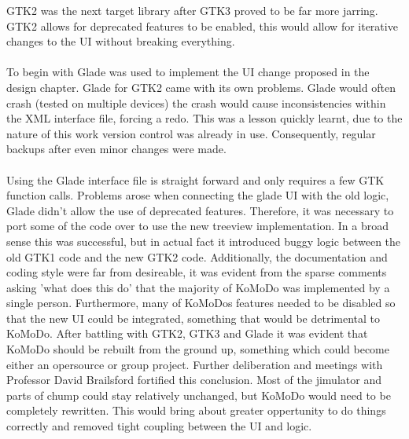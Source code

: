     GTK2 was the next target library after GTK3 proved to be far more jarring. GTK2 allows for deprecated features to be enabled, this would allow for iterative changes to the UI without breaking everything.\\\\
    To begin with Glade was used to implement the UI change proposed in the design chapter. Glade for GTK2 came with its own problems. Glade would often crash (tested on multiple devices) the crash would cause inconsistencies within the XML interface file, forcing a redo. This was a lesson quickly learnt, due to the nature of this work version control was already in use. Consequently, regular backups after even minor changes were made.\\\\
    Using the Glade interface file is straight forward and only requires a few GTK function calls. Problems arose when connecting the glade UI with the old logic, Glade didn't allow the use of deprecated features. Therefore, it was necessary to port some of the code over to use the new treeview implementation. In a broad sense this was successful, but in actual fact it introduced buggy logic between the old GTK1 code and the new GTK2 code. Additionally, the documentation and coding style were far from desireable, it was evident from the sparse comments asking 'what does this do' that the majority of KoMoDo was implemented by a single person. Furthermore, many of KoMoDos features needed to be disabled so that the new UI could be integrated, something that would be detrimental to KoMoDo.
    After battling with GTK2, GTK3 and Glade it was evident that KoMoDo should be rebuilt from the ground up, something which could become either an opersource or group project. Further deliberation and meetings with Professor David Brailsford fortified this conclusion. Most of the jimulator and parts of chump could stay relatively unchanged, but KoMoDo would need to be completely rewritten. This would bring about greater oppertunity to do things correctly and removed tight coupling between the UI and logic.\\\\

